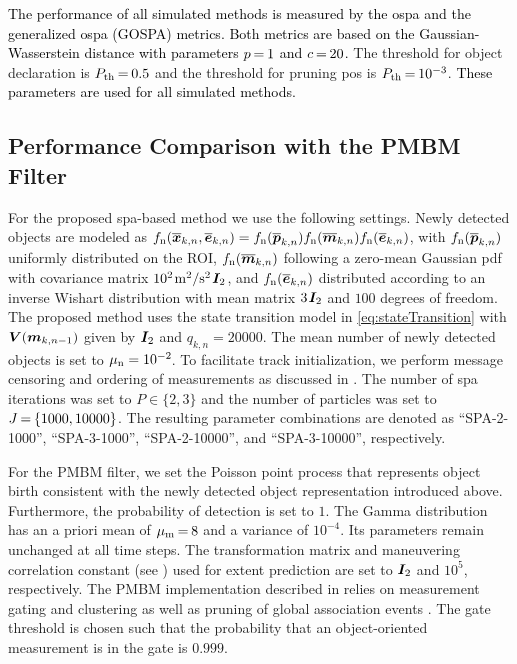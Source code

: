 \documentclass[10pt, twoside, romanappendices]{IEEEtran}
\providecommand{\rd}{\textcolor{black}}
\providecommand{\ist}{\hspace*{.3mm}}
\providecommand{\rmv}{\hspace*{-.3mm}}
\begin{document}
\rd{The performance of all simulated methods is measured by the \ac{ospa} \cite{SchVoVo:J08} and the generalized \ac{ospa} (GOSPA) \cite{RahGarSve:C17} metrics. Both metrics are based on the Gaussian-Wasserstein distance with parameters $p\rmv=\rmv1$ and $c\rmv=\rmv20$.} The threshold for object declaration is $P_{\text{th}} \rmv=\rmv 0.5$ and the threshold for pruning \acp{po} is $P_{\text{th}} \rmv=\rmv 10^{-3}$. \rd{These parameters are used for all simulated methods.}
\vspace{-2mm}

\subsection{Performance Comparison with the PMBM Filter}
\label{sec:compPMBM}

For the proposed \ac{spa}-based method we use the following settings. Newly detected objects are modeled as $f_{\mathrm{n}}(\overline{\bm{x}}_{k,n},\overline{\bm{e}}_{k,n})= f_{\mathrm{n}}(\overline{\bm{p}}_{k,n}) f_{\mathrm{n}}(\overline{\bm{m}}_{k,n})  f_{\mathrm{n}}(\overline{\bm{e}}_{k,n}) $, with $f_{\mathrm{n}}(\overline{\bm{p}}_{k,n})$ uniformly distributed on the ROI,  $f_{\mathrm{n}}(\overline{\bm{m}}_{k,n})$ following a zero-mean Gaussian \ac{pdf} with covariance matrix $10^2 \ist \text{m}^2/\text{s}^2  \ist \M{I}_2 $, and $f_{\mathrm{n}}(\overline{\bm{e}}_{k,n})$ distributed according to an inverse Wishart distribution with mean matrix $3 \ist \M{I}_2$ and $100$ degrees of freedom. The proposed method uses the state transition model in \eqref{eq:stateTransition} with $\M{V}(\V{m}_{k,n-1})$ given by $\M{I}_2$ and $q_{k,n} = 20000$. The mean number of newly detected objects is set to $\mu_{\mathrm{n}} = 10^{-2}\rmv$. To facilitate track initialization, we perform message censoring and ordering of measurements as discussed in \cite{MeyWil:C20}. The number of \ac{spa} iterations was set to $P \in \{2,3\}$ and the number of particles was set to $J\rmv=\rmv \{1000,10000\}$. The resulting parameter combinations are denoted as ``SPA-2-1000'', ``SPA-3-1000'', ``SPA-2-10000'',  and ``SPA-3-10000'', respectively. 

For the PMBM filter, we set the Poisson point process that represents object birth consistent with the newly detected object representation introduced above. Furthermore, the probability of detection is set to $1$. The Gamma distribution has an a priori mean of $\mu_{\mathrm{m}} \rmv=\rmv 8$ and a variance of $10^{-4}$. Its parameters remain unchanged at all time steps. The transformation matrix and maneuvering correlation constant (see \cite[Table III]{GraFatSve:J19}) used for extent prediction are set to $\M{I}_2$ and $10^5$, respectively. The PMBM implementation described in \cite{GraBauReu:J17} relies on measurement gating and clustering as well as pruning of global association events \cite{GraFatSve:J19}. The gate threshold is chosen such that the probability that an object-oriented measurement is in the gate is $0.999$. 
\end{document}
